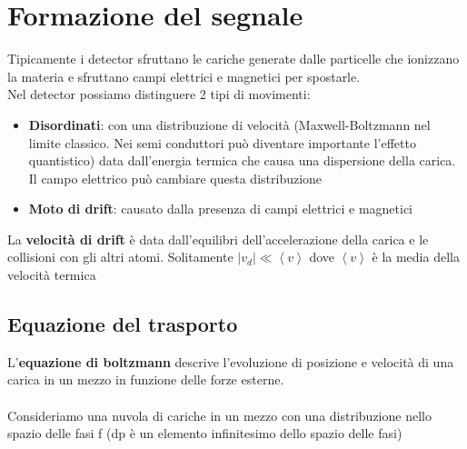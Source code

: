 \chapter{Formazione del segnale}

Tipicamente i detector sfruttano le cariche generate dalle particelle che ionizzano la materia e sfruttano campi elettrici e magnetici per spostarle.
\\
Nel detector possiamo distinguere 2 tipi di movimenti:
\begin{itemize}
    \item \textbf{Disordinati}: con una distribuzione di velocità (Maxwell-Boltzmann nel limite classico. Nei semi conduttori può diventare importante l'effetto quantistico) data dall'energia termica che causa una dispersione della carica. Il campo elettrico può cambiare questa distribuzione
    \item \textbf{Moto di drift}: causato dalla presenza di campi elettrici e magnetici
\end{itemize}
La \textbf{velocità di drift} è data dall'equilibri dell'accelerazione della carica e le collisioni con gli altri atomi.
Solitamente $|v_d|\ll \left<v\right>$ dove $\left<v\right>$ è la media della velocità termica

\section{Equazione del trasporto}
L'\textbf{equazione di boltzmann} descrive l'evoluzione di posizione e velocità di una carica in un mezzo in funzione delle forze esterne. 
\\ 
\\ 
Consideriamo una nuvola di cariche in un mezzo con una distribuzione nello spazio delle fasi f (dp è un elemento infinitesimo dello spazio delle fasi)

